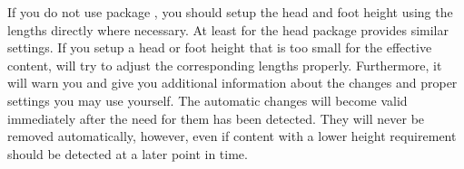 If you do not use package , you should setup the head and
foot height using the lengths directly where necessary. At least for the head
package  provides similar settings. If you setup a head or
foot height that is too small for the effective content,
 will try to adjust the corresponding lengths
properly. Furthermore, it will warn you and give you additional information
about the changes and proper settings you may use yourself. The automatic
changes will become valid immediately after the need for them has been
detected.  They will never be removed automatically, however, even if content
with a lower height requirement should be detected at a later point in time.%
%
%

\fi %

